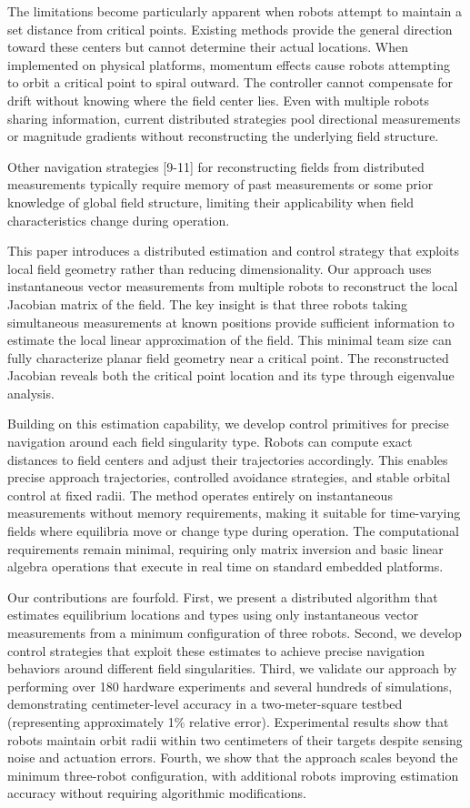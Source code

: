 \documentclass[lettersize,journal]{IEEEtran}
\begin{document}
The limitations become particularly apparent when robots attempt to maintain a set distance from critical points. Existing methods provide the general direction toward these centers but cannot determine their actual locations. When implemented on physical platforms, momentum effects cause robots attempting to orbit a critical point to spiral outward. The controller cannot compensate for drift without knowing where the field center lies. Even with multiple robots sharing information, current distributed strategies pool directional measurements or magnitude gradients without reconstructing the underlying field structure.

Other navigation strategies [9-11] for reconstructing fields from distributed measurements typically require memory of past measurements or some prior knowledge of global field structure, limiting their applicability when field characteristics change during operation.

This paper introduces a distributed estimation and control strategy that exploits local field geometry rather than reducing dimensionality. Our approach uses instantaneous vector measurements from multiple robots to reconstruct the local Jacobian matrix of the field. The key insight is that three robots taking simultaneous measurements at known positions provide sufficient information to estimate the local linear approximation of the field. This minimal team size can fully characterize planar field geometry near a critical point. The reconstructed Jacobian reveals both the critical point location and its type through eigenvalue analysis.

Building on this estimation capability, we develop control primitives for precise navigation around each field singularity type. Robots can compute exact distances to field centers and adjust their trajectories accordingly. This enables precise approach trajectories, controlled avoidance strategies, and stable orbital control at fixed radii. The method operates entirely on instantaneous measurements without memory requirements, making it suitable for time-varying fields where equilibria move or change type during operation. The computational requirements remain minimal, requiring only matrix inversion and basic linear algebra operations that execute in real time on standard embedded platforms.

Our contributions are fourfold. First, we present a distributed algorithm that estimates equilibrium locations and types using only instantaneous vector measurements from a minimum configuration of three robots. Second, we develop control strategies that exploit these estimates to achieve precise navigation behaviors around different field singularities. Third, we validate our approach by performing over 180 hardware experiments and several hundreds of simulations, demonstrating centimeter-level accuracy in a two-meter-square testbed (representing approximately 1\% relative error). Experimental results show that robots maintain orbit radii within two centimeters of their targets despite sensing noise and actuation errors. Fourth, we show that the approach scales beyond the minimum three-robot configuration, with additional robots improving estimation accuracy without requiring algorithmic modifications. 
\end{document}
